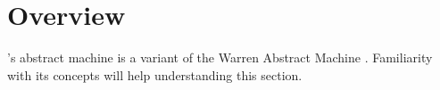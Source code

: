 %
% 
% 
% 
% 


\section{Overview}

\eclipse's abstract machine is a variant of the Warren Abstract
Machine \cite{warren83}. Familiarity with its concepts will help
understanding this section.

